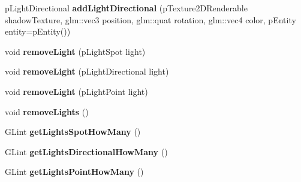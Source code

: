 \begin{DoxyCompactItemize}
\item 
\hypertarget{classfillwave_1_1manager_1_1LightManager_abd846f37d19c66fcccb8c3fef76e5a06}{}p\+Light\+Directional {\bfseries add\+Light\+Directional} (p\+Texture2\+D\+Renderable shadow\+Texture, glm\+::vec3 position, glm\+::quat rotation, glm\+::vec4 color, p\+Entity entity=p\+Entity())\label{classfillwave_1_1manager_1_1LightManager_abd846f37d19c66fcccb8c3fef76e5a06}

\item 
\hypertarget{classfillwave_1_1manager_1_1LightManager_afe5d317d70f4bd4e7fd31a4d68b69166}{}void {\bfseries remove\+Light} (p\+Light\+Spot light)\label{classfillwave_1_1manager_1_1LightManager_afe5d317d70f4bd4e7fd31a4d68b69166}

\item 
\hypertarget{classfillwave_1_1manager_1_1LightManager_aae119dab78760bb24ed56eb084108b16}{}void {\bfseries remove\+Light} (p\+Light\+Directional light)\label{classfillwave_1_1manager_1_1LightManager_aae119dab78760bb24ed56eb084108b16}

\item 
\hypertarget{classfillwave_1_1manager_1_1LightManager_aab8ddf66550290c5b0ac36d81625d9bf}{}void {\bfseries remove\+Light} (p\+Light\+Point light)\label{classfillwave_1_1manager_1_1LightManager_aab8ddf66550290c5b0ac36d81625d9bf}

\item 
\hypertarget{classfillwave_1_1manager_1_1LightManager_a5a09a81db30f69598dce305c3e4d3d11}{}void {\bfseries remove\+Lights} ()\label{classfillwave_1_1manager_1_1LightManager_a5a09a81db30f69598dce305c3e4d3d11}

\item 
\hypertarget{classfillwave_1_1manager_1_1LightManager_ac58329c748b34a65aef056a279a6e1ab}{}G\+Lint {\bfseries get\+Lights\+Spot\+How\+Many} ()\label{classfillwave_1_1manager_1_1LightManager_ac58329c748b34a65aef056a279a6e1ab}

\item 
\hypertarget{classfillwave_1_1manager_1_1LightManager_a9b7eaa47f2ba87c99e43dd061ded957c}{}G\+Lint {\bfseries get\+Lights\+Directional\+How\+Many} ()\label{classfillwave_1_1manager_1_1LightManager_a9b7eaa47f2ba87c99e43dd061ded957c}

\item 
\hypertarget{classfillwave_1_1manager_1_1LightManager_ac870410261af76810b8008da28c17cd4}{}G\+Lint {\bfseries get\+Lights\+Point\+How\+Many} ()\label{classfillwave_1_1manager_1_1LightManager_ac870410261af76810b8008da28c17cd4}


\end{DoxyCompactItemize}
